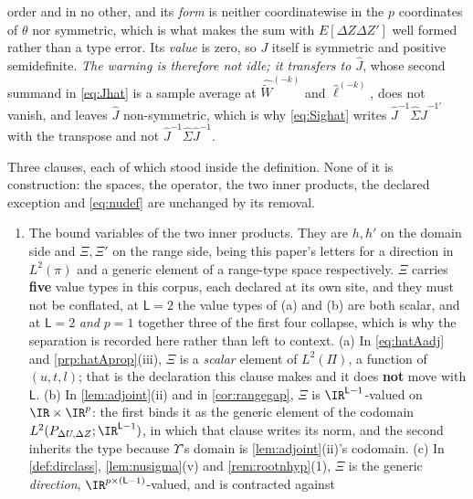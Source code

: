 \begin{remark}
\begin{enumerate}
{order and in no other}, and its \emph{form} is neither coordinatewise in the
$p$ coordinates of $\theta$ nor symmetric, which is what
makes the sum with $E[\Delta Z\Delta Z']$ well formed rather than a type error. Its \emph{value} is zero,
so $J$ itself is symmetric and positive semidefinite. \emph{The warning is therefore not idle; it
transfers to $\hat J$}, whose second summand in \eqref{eq:Jhat} is a sample average at
$\widehat{\widetilde W}^{(-k)}$ and $\hat\ell^{(-k)}$, does not vanish, and leaves $\hat J$
non-symmetric, which is why \eqref{eq:Sighat} writes $\hat J^{-1}\hat\Sigma\hat J^{-1\prime}$ with the
transpose and not $\hat J^{-1}\hat\Sigma\hat J^{-1}$.
\end{enumerate}
\end{remark}

\begin{remark}\label{rem:spacesread}
Three clauses, each of which stood inside the definition. None of it is construction: the spaces,
the operator, the two inner products, the declared exception and \eqref{eq:nudef} are unchanged by its
removal.
\begin{enumerate}
\item[(1)] The bound variables of the two inner products. They are $h,h'$ on the
domain side and $\Xi,\Xi'$ on the range side, being this paper's letters for a direction in
$L^{2}(\pi)$ and a generic element of a range-type space respectively.
$\Xi$ carries \textbf{five} value types in this corpus, each declared at its own site, and they
must not be conflated, at $\mathsf L=2$ the value types of \textup{(a)} and \textup{(b)} are both
scalar, and at $\mathsf L=2$ \emph{and} $p=1$ together three of the first four collapse, which is why the
separation is recorded here rather than left to context. \textup{(a)} In \eqref{eq:hatAadj} and
\cref{prp:hatAprop}\textup{(iii)}, $\Xi$ is a \emph{scalar} element of $L^{2}(\Pi)$, a function of
$(u,t,l)$; that is the declaration this clause makes and it does \textbf{not} move with $\mathsf L$.
\textup{(b)} In \cref{lem:adjoint}\textup{(ii)} and in \cref{cor:rangegap}, $\Xi$ is
$\IR^{\mathsf L-1}$-valued on
$\IR\times\IR^{p}$: the first binds it as the generic element of the codomain
$L^{2}(P_{\Delta U,\Delta Z};\IR^{\mathsf L-1})$, in which that clause writes its norm, and the second
inherits the type because $\Upsilon$'s domain is \cref{lem:adjoint}\textup{(ii)}'s codomain.
\textup{(c)} In \cref{def:dirclass}, \cref{lem:nusigma}\textup{(v)} and \cref{rem:rootnhyp}\textup{(1)},
$\Xi$ is the generic \emph{direction}, $\IR^{p\times(\mathsf L-1)}$-valued, and is contracted against

\end{enumerate}
\end{remark}
